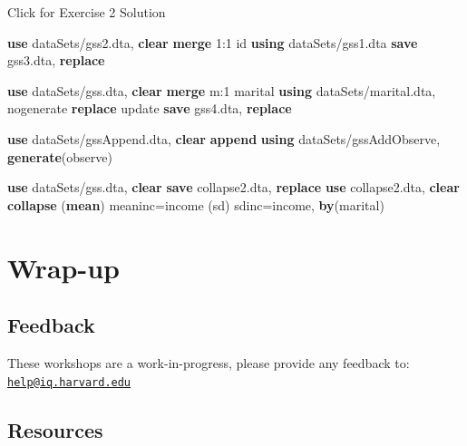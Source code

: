 \documentclass[
]{book}
\newenvironment{Shaded}{\begin{snugshade}}{\end{snugshade}}
\newcommand{\FunctionTok}[1]{\textcolor[rgb]{0.00,0.00,0.00}{#1}}
\newcommand{\KeywordTok}[1]{\textcolor[rgb]{0.13,0.29,0.53}{\textbf{#1}}}
\newcommand{\NormalTok}[1]{#1}
\begin{document}
{Click for Exercise 2 Solution}

\begin{alert}

\begin{Shaded}
\begin{Highlighting}[]
\KeywordTok{use}\NormalTok{ dataSets/gss2.dta, }\KeywordTok{clear}
\KeywordTok{merge}\NormalTok{ 1:1 id }\KeywordTok{using}\NormalTok{ dataSets/gss1.dta}
\KeywordTok{save}\NormalTok{ gss3.dta, }\KeywordTok{replace}

\KeywordTok{use}\NormalTok{ dataSets/gss.dta, }\KeywordTok{clear}
\KeywordTok{merge} \FunctionTok{m}\NormalTok{:1 marital }\KeywordTok{using}\NormalTok{ dataSets/marital.dta, nogenerate }\KeywordTok{replace}\NormalTok{ update}
\KeywordTok{save}\NormalTok{ gss4.dta, }\KeywordTok{replace}

\KeywordTok{use}\NormalTok{ dataSets/gssAppend.dta, }\KeywordTok{clear}
\KeywordTok{append} \KeywordTok{using}\NormalTok{ dataSets/gssAddObserve, }\KeywordTok{generate}\NormalTok{(observe) }

\KeywordTok{use}\NormalTok{ dataSets/gss.dta, }\KeywordTok{clear}
\KeywordTok{save}\NormalTok{ collapse2.dta, }\KeywordTok{replace}
\KeywordTok{use}\NormalTok{ collapse2.dta, }\KeywordTok{clear}
\KeywordTok{collapse}\NormalTok{ (}\KeywordTok{mean}\NormalTok{) meaninc=income (}\FunctionTok{sd}\NormalTok{) sdinc=income, }\KeywordTok{by}\NormalTok{(marital)}
\end{Highlighting}
\end{Shaded}

\end{alert}

\hypertarget{wrap-up-8}{%
\section{Wrap-up}\label{wrap-up-8}}

\hypertarget{feedback-8}{%
\subsection{Feedback}\label{feedback-8}}

These workshops are a work-in-progress, please provide any feedback to: \href{mailto:help@iq.harvard.edu}{\nolinkurl{help@iq.harvard.edu}}

\hypertarget{resources-11}{%
\subsection{Resources}\label{resources-11}}
\end{document}
